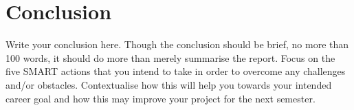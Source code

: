 \documentclass{scrartcl}
\begin{document}
\section{Conclusion}

Write your conclusion here. Though the conclusion should be brief, no more than 100 words, it should do more than merely summarise the report. Focus on the five SMART actions that you intend to take in order to overcome any challenges and/or obstacles. Contextualise how this will help you towards your intended career goal and how this may improve your project for the next semester.



\end{document}
